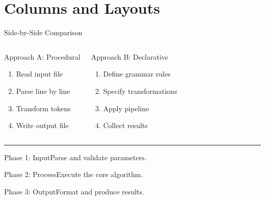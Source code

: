 \documentclass[doctype=beamer, beameraspectratio=169, beamertheme=Madrid, institution=generic]{omnilatex}
\begin{document}
\section{Columns and Layouts}
\begin{frame}{Side-by-Side Comparison}
  \begin{columns}[T]
    \begin{block}{Approach A: Procedural}
      \begin{enumerate}
        \item Read input file
        \item Parse line by line
        \item Transform tokens
        \item Write output file
      \end{enumerate}
    \end{block}
    \begin{block}{Approach B: Declarative}
      \begin{enumerate}
        \item Define grammar rules
        \item Specify transformations
        \item Apply pipeline
        \item Collect results
      \end{enumerate}
    \end{block}
  \end{columns}
  \vspace{0.5em}
  \rule{1\textwidth}{0.4pt}
  \vspace{0.5em}
  \begin{minipage}{0.3\textwidth}
    \begin{block}{Phase 1: Input}Parse and validate parameters.\end{block}
  \end{minipage}\hfill
  \begin{minipage}{0.3\textwidth}
    \begin{block}{Phase 2: Process}Execute the core algorithm.\end{block}
  \end{minipage}\hfill
  \begin{minipage}{0.3\textwidth}
    \begin{block}{Phase 3: Output}Format and produce results.\end{block}
  \end{minipage}
\end{frame}
\end{document}
